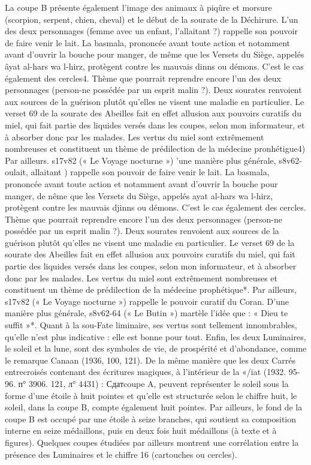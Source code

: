 La coupe B présente également l'image des animaux à piqûre et morsure (scorpion, serpent, chien, cheval) et le début de la sourate de la Déchirure. L'un des deux personnages (femme avec un enfant, l'allaitant ?) rappelle son pouvoir de faire venir le lait. La basmala, prononcée avant toute action et notamment avant d'ouvrir la bouche pour manger, de même que les Versets du Siège, appelés âyat al-hars wa l-hirz, protègent contre les mauvais dinns ou démons. C'est le cas également des cercles4.
Thème que pourrait reprendre encore l'un des deux personnages (person-ne possédée par un esprit malin ?). Deux sourates renvoient aux sources de la guérison plutôt qu'elles ne visent une maladie en particulier. Le verset 69 de la sourate des Abeilles fait en effet allusion aux pouvoirs curatifs du miel, qui fait partie des liquides versés dans les coupes, selon mon informateur, et à absorber donc par les malades. Les vertus du miel sont extrêmement nombreuses et constituent un thème de prédilection de la médecine pronhétigue4) Par ailleurs. s17v82 (« Le Voyage nocturne »)
'une manière plus générale, s8v62-oulait, allaitant
) rappelle son pouvoir de faire venir le lait. La basmala, prononcée avant toute action et notamment avant d'ouvrir la bouche pour manger, de nême que les Versets du Siège, appelés ayat al-hars wa l-hirz, protègent contre les mauvais djinns ou démons. C'est le cas également des cercles.
Thème que pourrait reprendre encore l'un des deux personnages (person-ne possédée par un esprit malin ?). Deux sourates renvoient aux sources de la guérison plutôt qu'elles ne visent une maladie en particulier. Le verset 69 de la sourate des Abeilles fait en effet allusion aux pouvoirs curatifs du miel, qui fait partie des liquides versés dans les coupes, selon mon informateur, et à absorber donc par les malades. Les vertus du miel sont extrêmement nombreuses et constituent un thème de prédilection de la médecine prophétique*. Par ailleurs, s17v82 (« Le Voyage nocturne ») rappelle le pouvoir curatif du Coran. D'une manière plus générale, s8v62-64 (« Le Butin ») martèle l'idée que : « Dieu te suffit »*. Quant à la sou-Fate liminaire, ses vertus sont tellement innombrables, qu'elle n'est plus indicative : elle est bonne pour tout. Enfin, les deux Luminaires, le soleil et la lune, sont des symboles de vie, de prospérité et d'abondance, comme le remarque Canaan (1936, 100, 121). De la même manière que les deux Carrés entrecroisés contenant des écritures magiques, à l'intérieur de la
«/iat (1932. 95-96. п° 3906. 121, л° 4431) : Сдатcoupe A, peuvent représenter le soleil sous la forme d'une étoile à huit pointes et qu'elle est structurée selon le chiffre huit, le soleil, dans la coupe B, compte également huit pointes. Par ailleurs, le fond de la coupe B est occupé par une étoile à seize branches, qui soutient sa composition interne en seize médaillons, puis en deux fois huit médaillons (à texte et à figures). Quelques coupes étudiées par ailleurs montrent une corrélation entre la présence des Luminaires et le chiffre 16 (cartouches ou cercles).
